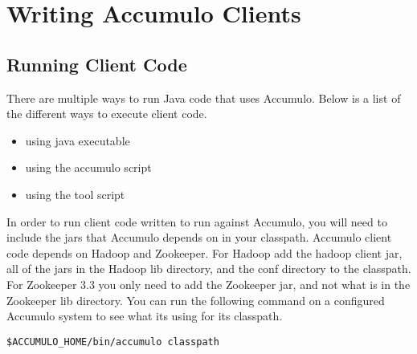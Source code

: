 
%
%

\chapter{Writing Accumulo Clients}

\section{Running Client Code}

There are multiple ways to run Java code that uses Accumulo. Below is a list
of the different ways to execute client code.

\begin{itemize} 
  \item using java executable 
  \item using the accumulo script
  \item using the tool script 
\end{itemize}

In order to run client code written to run against Accumulo, you will need to
include the jars that Accumulo depends on in your classpath. Accumulo client
code depends on Hadoop and Zookeeper. For Hadoop add the hadoop client jar, all
of the jars in the Hadoop lib directory, and the conf directory to the
classpath. For Zookeeper 3.3 you only need to add the Zookeeper jar, and not
what is in the Zookeeper lib directory. You can run the following command on a
configured Accumulo system to see what its using for its classpath.

\begingroup\fontsize{8pt}{8pt}\selectfont\begin{verbatim}
$ACCUMULO_HOME/bin/accumulo classpath
\end{verbatim}\endgroup

